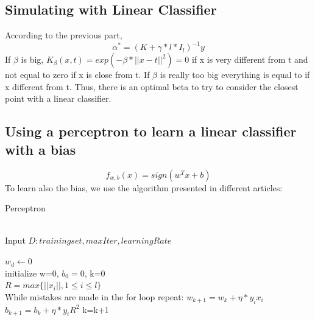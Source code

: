 \documentclass{article} %
\begin{document}
\subsection{Simulating  with Linear Classifier}

According to the previous part, 
\begin{equation*}
\alpha^{*}=(K+\gamma*l*I_{l})^{-1}y
\end{equation*}
If $\beta$ is big, $K_{\beta}(x,t)=exp(-\beta*||x-t||^2)=0$ if x is very different from t and not equal to zero if x is close from t. If $\beta$ is really too big everything is equal to if x different from t. Thus, there is an optimal beta to try to consider the closest point with a linear classifier.

\subsection{Using a perceptron to learn a linear classifier with a bias}
\begin{equation*}
f_{w,b}(x)=sign(w^{T}x+b)
\end{equation*}
To learn also the bias, we use the algorithm presented in different articles: 
\begin{algorithm} [H]
\caption{Perceptron}
\\Input $D: training set, maxIter, learningRate$ 
\begin{algorithmic} [1]
\State $w_d\gets 0$
\\initialize w=0, $b_{0}=0$, k=0
\\$R=max\{||x_{i}||, 1 \leq i \leq l\}$
 \\While mistakes are made in the for loop repeat:
   		     \State $w_{k+1}=w_{k}+\eta*y_{i}x_{i}$
		     \State $b_{k+1}=b_{k}+\eta*y_{i}R^{2}$
		     \State k=k+1
  		 \EndIf
	 \EndFor
 \EndFor
 \State{}
\end{algorithmic}
\end{algorithm}
\end{document}
